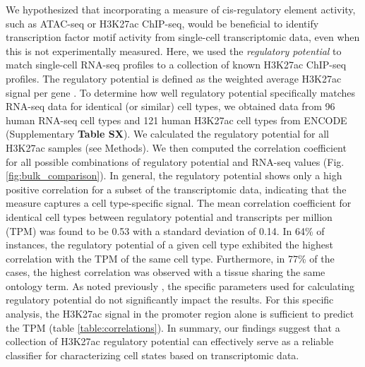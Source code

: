 We hypothesized that incorporating a measure of cis-regulatory element activity, such as ATAC-seq or H3K27ac ChIP-seq, would be beneficial to identify transcription factor motif activity from single-cell transcriptomic data, even when this is not experimentally measured. Here, we used the \textit{regulatory potential} to match single-cell RNA-seq profiles to a collection of known H3K27ac ChIP-seq profiles. The regulatory potential is defined as the weighted average H3K27ac signal per gene \cite{Wang2016}. To determine how well regulatory potential specifically matches RNA-seq data for identical (or similar) cell types, we obtained data from 96 human RNA-seq cell types and 121 human H3K27ac cell types from ENCODE\cite{encode_dcc} (Supplementary \textbf{Table SX}). We calculated the regulatory potential for all H3K27ac samples (see Methods). We then computed the correlation coefficient for all possible combinations of regulatory potential and RNA-seq values (Fig. \ref{fig:bulk_comparison}). In general, the regulatory potential shows only a high positive correlation for a subset of the transcriptomic data, indicating that the measure captures a cell type-specific signal. The mean correlation coefficient for identical cell types between regulatory potential and transcripts per million (TPM) was found to be 0.53 with a standard deviation of 0.14. In 64\% of instances, the regulatory potential of a given cell type exhibited the highest correlation with the TPM of the same cell type. Furthermore, in 77\% of the cases, the highest correlation was observed with a tissue sharing the same ontology term. As noted previously \cite{Wang2016}, the specific parameters used for calculating regulatory potential do not significantly impact the results. For this specific analysis, the H3K27ac signal in the promoter region alone is sufficient to predict the TPM (table \ref{table:correlations}). In summary, our findings suggest that a collection of H3K27ac regulatory potential can effectively serve as a reliable classifier for characterizing cell states based on transcriptomic data.

